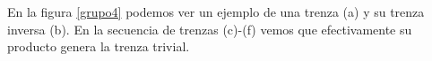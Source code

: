 \documentclass[14pt]{extarticle}
\begin{document}
En la figura \ref{grupo4} podemos ver un ejemplo de una trenza (a) y su trenza inversa (b). En la secuencia de trenzas (c)-(f) vemos que efectivamente su producto genera la trenza trivial.\\
   \begin{figure}[h!]
   	\centering
   	

\end{figure}
\end{document}
